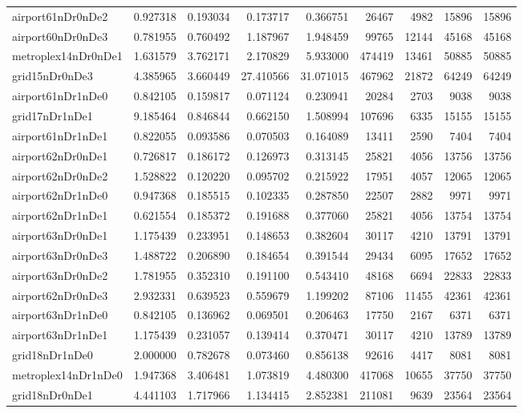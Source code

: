 \begin{longtable}{|l|r|r|r|r|r|r|r|r|}
airport61nDr0nDe2 & 0.927318 & 0.193034 & 0.173717 & 0.366751 & 26467 & 4982 & 15896 & 15896 \\
airport60nDr0nDe3 & 0.781955 & 0.760492 & 1.187967 & 1.948459 & 99765 & 12144 & 45168 & 45168 \\
metroplex14nDr0nDe1 & 1.631579 & 3.762171 & 2.170829 & 5.933000 & 474419 & 13461 & 50885 & 50885 \\
grid15nDr0nDe3 & 4.385965 & 3.660449 & 27.410566 & 31.071015 & 467962 & 21872 & 64249 & 64249 \\
airport61nDr1nDe0 & 0.842105 & 0.159817 & 0.071124 & 0.230941 & 20284 & 2703 & 9038 & 9038 \\
grid17nDr1nDe1 & 9.185464 & 0.846844 & 0.662150 & 1.508994 & 107696 & 6335 & 15155 & 15155 \\
airport61nDr1nDe1 & 0.822055 & 0.093586 & 0.070503 & 0.164089 & 13411 & 2590 & 7404 & 7404 \\
airport62nDr0nDe1 & 0.726817 & 0.186172 & 0.126973 & 0.313145 & 25821 & 4056 & 13756 & 13756 \\
airport62nDr0nDe2 & 1.528822 & 0.120220 & 0.095702 & 0.215922 & 17951 & 4057 & 12065 & 12065 \\
airport62nDr1nDe0 & 0.947368 & 0.185515 & 0.102335 & 0.287850 & 22507 & 2882 & 9971 & 9971 \\
airport62nDr1nDe1 & 0.621554 & 0.185372 & 0.191688 & 0.377060 & 25821 & 4056 & 13754 & 13754 \\
airport63nDr0nDe1 & 1.175439 & 0.233951 & 0.148653 & 0.382604 & 30117 & 4210 & 13791 & 13791 \\
airport63nDr0nDe3 & 1.488722 & 0.206890 & 0.184654 & 0.391544 & 29434 & 6095 & 17652 & 17652 \\
airport63nDr0nDe2 & 1.781955 & 0.352310 & 0.191100 & 0.543410 & 48168 & 6694 & 22833 & 22833 \\
airport62nDr0nDe3 & 2.932331 & 0.639523 & 0.559679 & 1.199202 & 87106 & 11455 & 42361 & 42361 \\
airport63nDr1nDe0 & 0.842105 & 0.136962 & 0.069501 & 0.206463 & 17750 & 2167 & 6371 & 6371 \\
airport63nDr1nDe1 & 1.175439 & 0.231057 & 0.139414 & 0.370471 & 30117 & 4210 & 13789 & 13789 \\
grid18nDr1nDe0 & 2.000000 & 0.782678 & 0.073460 & 0.856138 & 92616 & 4417 & 8081 & 8081 \\
metroplex14nDr1nDe0 & 1.947368 & 3.406481 & 1.073819 & 4.480300 & 417068 & 10655 & 37750 & 37750 \\
grid18nDr0nDe1 & 4.441103 & 1.717966 & 1.134415 & 2.852381 & 211081 & 9639 & 23564 & 23564 \\

\end{longtable}
